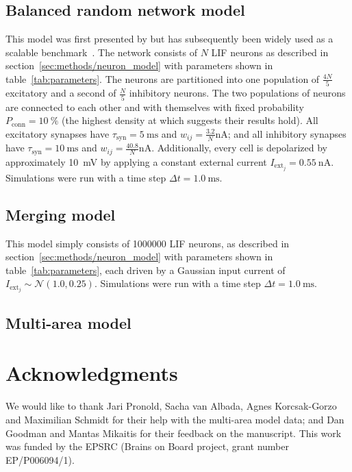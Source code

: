 \documentclass[9pt,a4paper]{amsart}
\begin{document}
\subsection{Balanced random network model}
\label{sec:methods/va_benchmark}
This model was first presented by \citet{Vogels2005} but has subsequently been widely used as a scalable benchmark~\citep{Brette2007}.
The network consists of $N$ LIF neurons as described in section~\ref{sec:methods/neuron_model} with parameters shown in table~\ref{tab:parameters}.
The neurons are partitioned into one population of $\frac{4N}{5}$ excitatory and a second of $\frac{N}{5}$ inhibitory neurons.
The two populations of neurons are connected to each other and with themselves with fixed probability $P_{\text{conn}}=\SI{10}{\percent}$ (the highest density at which \citet{Vogels2005} suggests their results hold).
All excitatory synapses have $\tau_{\text{syn}}=\SI{5}{\milli\second}$ and $w_{ij}=\frac{3.2}{N}\si{\nano\ampere}$; and all inhibitory synapses have $\tau_{\text{syn}}=\SI{10}{\milli\second}$ and $w_{ij}=\frac{40.8}{N}\si{\nano\ampere}$.
Additionally, every cell is depolarized by approximately \SI{10}{\milli\volt} by applying a constant external current $I_{\text{ext}_j}= \SI{0.55}{\nano\ampere}$.
Simulations were run with a time step $\Delta t = \SI{1.0}{\milli\second}$.

\subsection{Merging model}
\label{sec:methods/merging}
This model simply consists of \num{1000000} LIF neurons, as described in section~\ref{sec:methods/neuron_model} with parameters shown in table~\ref{tab:parameters}, each driven by a Gaussian input current of $I_{\text{ext}_j} \sim \mathcal{N}(1.0, 0.25)$.
Simulations were run with a time step $\Delta t = \SI{1.0}{\milli\second}$.

\subsection{Multi-area model}

\section{Acknowledgments}
We would like to thank Jari Pronold, Sacha van Albada, Agnes Korcsak-Gorzo and Maximilian Schmidt for their help with the multi-area model data; and Dan Goodman and Mantas Mikaitis for their feedback on the manuscript.
This work was funded by the EPSRC (Brains on Board project, grant number EP/P006094/1).
\end{document}
